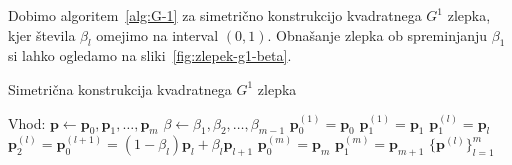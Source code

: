 \documentclass[isrm2, tisk]{fmfdelo}
\newcommand{\p}{\mathbf{p}}
\begin{document}
    Dobimo algoritem~\ref{alg:G-1} za simetrično konstrukcijo kvadratnega $G^1$ zlepka, kjer števila $\beta_l$ omejimo na interval $(0,1)$.
    Obnašanje zlepka ob spreminjanju $\beta_1$ si lahko ogledamo na sliki~\ref{fig:zlepek-g1-beta}.
    \begin{algorithm}[H]
        \caption{Simetrična konstrukcija kvadratnega $G^1$ zlepka}
        \label{alg:G-1}
        \begin{algorithmic}
            \State Vhod:
            \State $\p \gets \p_0,\p_1,\dots,\p_{m}$
            \State $\beta \gets \beta_1,\beta_2,\dots,\beta_{m-1}$
            \State
            \State $\p_0^{(1)} = \p_0$
            \State $\p_1^{(1)} = \p_1$
                \State $\p_1^{(l)}=\p_{l}$
                \State $\p_2^{(l)} = \p_0^{(l+1)} = (1-\beta_l)\p_l+\beta_l\p_{l+1}$
            \EndFor
            \State $\p_0^{(m)} = \p_m$
            \State $\p_1^{(m)} = \p_{m+1}$
            \State
            \State \Return $\{\mathbf{p}^{(l)}\}^{m}_{l=1}$
        \end{algorithmic}
    \end{algorithm}
\end{document}
